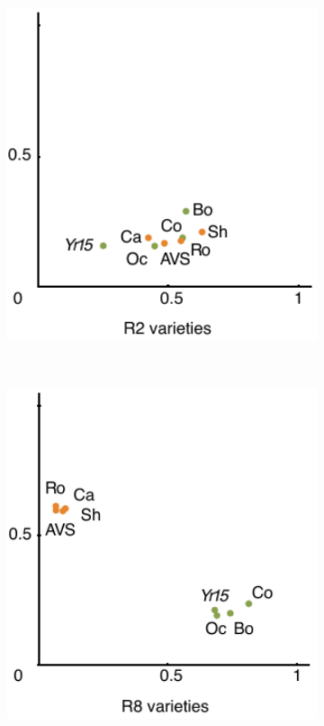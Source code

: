 \begin{figure}[b!]
\begin{subfigure}{0.31\textwidth}
\caption{}
\label{fig:yr15:r2}
\includegraphics[width=1\textwidth]{Yr15/Figures/selection/R2.pdf}
\end{subfigure}
~
\begin{subfigure}{0.31\textwidth}
\caption{}
\label{fig:yr15:r8}
\includegraphics[width=1\textwidth]{Yr15/Figures/selection/R8.pdf}

\end{subfigure}
\end{figure}
